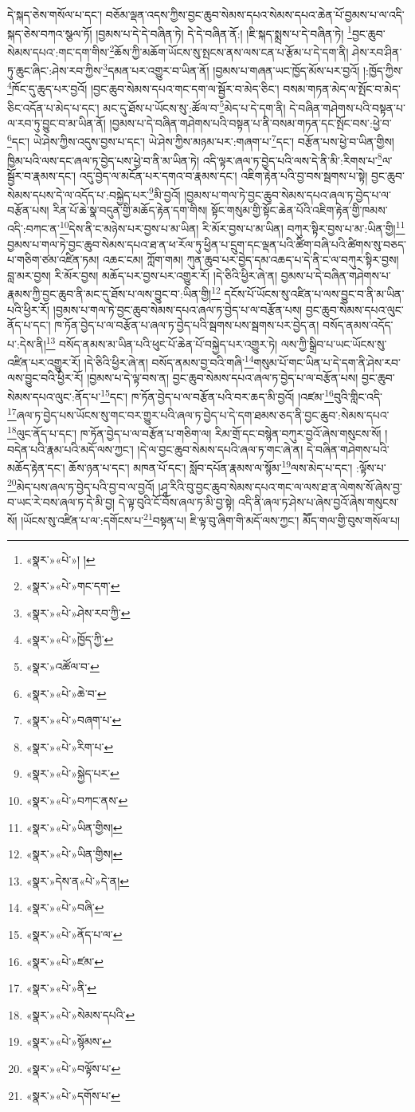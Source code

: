 དེ་སྐད་ཅེས་གསོལ་པ་དང་། བཅོམ་ལྡན་འདས་ཀྱིས་བྱང་ཆུབ་སེམས་དཔའ་སེམས་དཔའ་ཆེན་པོ་བྱམས་པ་ལ་འདི་སྐད་ཅེས་བཀའ་སྩལ་ཏོ། །བྱམས་པ་དེ་དེ་བཞིན་ཏེ། དེ་དེ་བཞིན་ནོ:། །ཇི་སྐད་སྨྲས་པ་དེ་བཞིན་ཏེ། \footnote{«སྣར་»«པེ་»། ། }བྱང་ཆུབ་སེམས་དཔའ་:གང་དག་གིས་\footnote{«སྣར་»«པེ་»གང་དག་}ཆོས་ཀྱི་མཆོག་ཡོངས་སུ་སྤངས་ནས་ལས་ངན་པ་རྩོམ་པ་དེ་དག་ནི། ཤེས་རབ་ཤིན་ཏུ་ཆུང་ཞིང་:ཤེས་རབ་ཀྱིས་\footnote{«སྣར་»«པེ་»ཤེས་རབ་ཀྱི་}དམན་པར་འགྱུར་བ་ཡིན་ནོ། །བྱམས་པ་གཞན་ཡང་ཁྱོད་མོས་པར་བྱའོ། །:ཁྱོད་ཀྱིས་\footnote{«སྣར་»«པེ་»ཁྱོད་ཀྱི་}ཁོང་དུ་ཆུད་པར་བྱའོ། །བྱང་ཆུབ་སེམས་དཔའ་གང་དག་ལ་སྦྱོར་བ་མེད་ཅིང་། བསམ་གཏན་མེད་ལ་སྤོང་བ་མེད་ཅིང་འདོན་པ་མེད་པ་དང་། མང་དུ་ཐོས་པ་ཡོངས་སུ་:ཚོལ་བ་\footnote{«སྣར་»འཚོལ་བ་}མེད་པ་དེ་དག་ནི། དེ་བཞིན་གཤེགས་པའི་བསྟན་པ་ལ་རབ་ཏུ་བྱུང་བ་མ་ཡིན་ནོ། །བྱམས་པ་དེ་བཞིན་གཤེགས་པའི་བསྟན་པ་ནི་བསམ་གཏན་དང་སྤོང་བས་:ཕྱེ་བ་\footnote{«སྣར་»«པེ་»ཆེ་བ་}དང་། ཡེ་ཤེས་ཀྱིས་འདུས་བྱས་པ་དང་། ཡེ་ཤེས་ཀྱིས་མཉམ་པར་:གཞག་པ་\footnote{«སྣར་»«པེ་»བཞག་པ་}དང་། བརྩོན་པས་ཕྱེ་བ་ཡིན་གྱིས། ཁྱིམ་པའི་ལས་དང་ཞལ་ཏ་བྱེད་པས་ཕྱེ་བ་ནི་མ་ཡིན་ཏེ། འདི་ལྟར་ཞལ་ཏ་བྱེད་པའི་ལས་དེ་ནི་མི་:རིགས་པ་\footnote{«སྣར་»«པེ་»རིག་པ་}ལ་སྦྱོར་བ་རྣམས་དང་། འདུ་བྱེད་ལ་མངོན་པར་དགའ་བ་རྣམས་དང་། འཇིག་རྟེན་པའི་བྱ་བས་སྦགས་པ་སྟེ། བྱང་ཆུབ་སེམས་དཔས་དེ་ལ་འདོད་པ་:བསྐྱེད་པར་\footnote{«སྣར་»«པེ་»སྐྱེད་པར་}མི་བྱའོ། །བྱམས་པ་གལ་ཏེ་བྱང་ཆུབ་སེམས་དཔའ་ཞལ་ཏ་བྱེད་པ་ལ་བརྩོན་པས། རིན་པོ་ཆེ་སྣ་བདུན་གྱི་མཆོད་རྟེན་དག་གིས། སྟོང་གསུམ་གྱི་སྟོང་ཆེན་པོའི་འཇིག་རྟེན་གྱི་ཁམས་འདི་:བཀང་ན་\footnote{«སྣར་»«པེ་»བཀང་ནས་}དེས་ནི་ང་མཉེས་པར་བྱས་པ་མ་ཡིན། རི་མོར་བྱས་པ་མ་ཡིན། བཀུར་སྟིར་བྱས་པ་མ་:ཡིན་གྱི།\footnote{«སྣར་»«པེ་»ཡིན་གྱིས།} བྱམས་པ་གལ་ཏེ་བྱང་ཆུབ་སེམས་དཔའ་ཐ་ན་ཕ་རོལ་ཏུ་ཕྱིན་པ་དྲུག་དང་ལྡན་པའི་ཚིག་བཞི་པའི་ཚིགས་སུ་བཅད་པ་གཅིག་ཙམ་འཛིན་ཏམ། འཆང་ངམ། ཀློག་གམ། ཀུན་ཆུབ་པར་བྱེད་དམ་འཆད་པ་དེ་ནི་ང་ལ་བཀུར་སྟིར་བྱས། བླ་མར་བྱས། རི་མོར་བྱས། མཆོད་པར་བྱས་པར་འགྱུར་རོ། །དེ་ཅིའི་ཕྱིར་ཞེ་ན། བྱམས་པ་དེ་བཞིན་གཤེགས་པ་རྣམས་ཀྱི་བྱང་ཆུབ་ནི་མང་དུ་ཐོས་པ་ལས་བྱུང་བ་:ཡིན་གྱི།\footnote{«སྣར་»«པེ་»ཡིན་གྱིས།} དངོས་པོ་ཡོངས་སུ་འཛིན་པ་ལས་བྱུང་བ་ནི་མ་ཡིན་པའི་ཕྱིར་རོ། །བྱམས་པ་གལ་ཏེ་བྱང་ཆུབ་སེམས་དཔའ་ཞལ་ཏ་བྱེད་པ་ལ་བརྩོན་པས། བྱང་ཆུབ་སེམས་དཔའ་ལུང་ནོད་པ་དང་། ཁ་ཏོན་བྱེད་པ་ལ་བརྩོན་པ་ཞལ་ཏ་བྱེད་པའི་སྦགས་པས་སྦགས་པར་བྱེད་ན། བསོད་ནམས་འདོད་པ་:དེས་ནི།\footnote{«སྣར་»དེས་ན«པེ་»དེ་ན།} བསོད་ནམས་མ་ཡིན་པའི་ཕུང་པོ་ཆེན་པོ་བསྐྱེད་པར་འགྱུར་ཏེ། ལས་ཀྱི་སྒྲིབ་པ་ཡང་ཡོངས་སུ་འཛིན་པར་འགྱུར་རོ། །དེ་ཅིའི་ཕྱིར་ཞེ་ན། བསོད་ནམས་བྱ་བའི་གཞི་\footnote{«སྣར་»«པེ་»བཞི་}གསུམ་པོ་གང་ཡིན་པ་དེ་དག་ནི་ཤེས་རབ་ལས་བྱུང་བའི་ཕྱིར་རོ། །བྱམས་པ་དེ་ལྟ་བས་ན། བྱང་ཆུབ་སེམས་དཔའ་ཞལ་ཏ་བྱེད་པ་ལ་བརྩོན་པས། བྱང་ཆུབ་སེམས་དཔའ་ལུང་:ནོད་པ་\footnote{«སྣར་»«པེ་»ནོད་པ་ལ་}དང་། ཁ་ཏོན་བྱེད་པ་ལ་བརྩོན་པའི་བར་ཆད་མི་བྱའོ། །འཛམ་\footnote{«སྣར་»«པེ་»ཛམ་}བུའི་གླིང་འདི་\footnote{«སྣར་»«པེ་»ནི་}ཞལ་ཏ་བྱེད་པས་ཡོངས་སུ་གང་བར་གྱུར་པའི་ཞལ་ཏ་བྱེད་པ་དེ་དག་ཐམས་ཅད་ནི་བྱང་ཆུབ་:སེམས་དཔའ་\footnote{«སྣར་»«པེ་»སེམས་དཔའི་}ལུང་ནོད་པ་དང་། ཁ་ཏོན་བྱེད་པ་ལ་བརྩོན་པ་གཅིག་ལ། རིམ་གྲོ་དང་བསྙེན་བཀུར་བྱའོ་ཞེས་གསུངས་སོ། །བདེན་པའི་རྣམ་པའི་མདོ་ལས་ཀྱང་། །དེ་ལ་བྱང་ཆུབ་སེམས་དཔའི་ཞལ་ཏ་གང་ཞེ་ན། དེ་བཞིན་གཤེགས་པའི་མཆོད་རྟེན་དང་། ཆོས་ཉན་པ་དང་། མཁན་པོ་དང་། སློབ་དཔོན་རྣམས་ལ་སྙོམ་\footnote{«སྣར་»«པེ་»སྙོམས་}ལས་མེད་པ་དང་། :ལྟོས་པ་\footnote{«སྣར་»«པེ་»བལྟོས་པ་}མེད་པས་ཞལ་ཏ་བྱེད་པའི་བྱ་བ་ལ་བྱའོ། །ཤཱ་རིའི་བུ་བྱང་ཆུབ་སེམས་དཔའ་གང་ལ་ལས་ཐ་ན་ལེགས་སོ་ཞེས་བྱ་བ་ཡང་རེ་བས་ཞལ་ཏ་དེ་མི་བྱ། དེ་ལྟ་བུའི་ངོ་བོས་ཞལ་ཏ་མི་བྱ་སྟེ། འདི་ནི་ཞལ་ཏ་ཤེས་པ་ཞེས་བྱའོ་ཞེས་གསུངས་སོ། །ཡོངས་སུ་འཛིན་པ་ལ་:དགོངས་པ་\footnote{«སྣར་»«པེ་»དགོས་པ་}བསྟན་པ། ཇི་ལྟ་བུ་ཞིག་གི་མདོ་ལས་ཀྱང་། མཽད་གལ་གྱི་བུས་གསོལ་པ། 